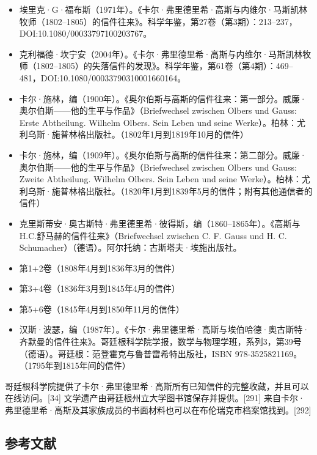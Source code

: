 \begin{itemize}
\item 埃里克·G·福布斯（1971年）。《卡尔·弗里德里希·高斯与内维尔·马斯凯林牧师（1802–1805）的信件往来》。科学年鉴，第27卷（第3期）：213–237，DOI:10.1080/00033797100203767。
\item 克利福德·坎宁安（2004年）。《卡尔·弗里德里希·高斯与内维尔·马斯凯林牧师（1802–1805）的失落信件的发现》。科学年鉴，第61卷（第4期）：469–481，DOI:10.1080/00033790310001660164。
\item 卡尔·施林，编（1900年）。《奥尔伯斯与高斯的信件往来：第一部分。威廉·奥尔伯斯——他的生平与作品》（Briefwechsel zwischen Olbers und Gauss: Erste Abtheilung. Wilhelm Olbers. Sein Leben und seine Werke）。柏林：尤利乌斯·施普林格出版社。（1802年1月到1819年10月的信件）
\item 卡尔·施林，编（1909年）。《奥尔伯斯与高斯的信件往来：第二部分。威廉·奥尔伯斯——他的生平与作品》（Briefwechsel zwischen Olbers und Gauss: Zweite Abtheilung. Wilhelm Olbers. Sein Leben und seine Werke）。柏林：尤利乌斯·施普林格出版社。（1820年1月到1839年5月的信件；附有其他通信者的信件）
\item 克里斯蒂安·奥古斯特·弗里德里希·彼得斯，编（1860–1865年）。《高斯与H.C.舒马赫的信件往来》（Briefwechsel zwischen C. F. Gauss und H. C. Schumacher）（德语）。阿尔托纳：古斯塔夫·埃施出版社。
\item 第1+2卷（1808年4月到1836年3月的信件）
\item 第3+4卷（1836年3月到1845年4月的信件）
\item 第5+6卷（1845年4月到1850年11月的信件）
\item 汉斯·波瑟，编（1987年）。《卡尔·弗里德里希·高斯与埃伯哈德·奥古斯特·齐默曼的信件往来》。哥廷根科学院学报，数学与物理学班，系列3，第39号（德语）。哥廷根：范登霍克与鲁普雷希特出版社，ISBN 978-3525821169。（1795年到1815年间的信件）
\end{itemize}
哥廷根科学院提供了卡尔·弗里德里希·高斯所有已知信件的完整收藏，并且可以在线访问。[34] 文学遗产由哥廷根州立大学图书馆保存并提供。[291] 来自卡尔·弗里德里希·高斯及其家族成员的书面材料也可以在布伦瑞克市档案馆找到。[292]
\subsection{参考文献}  
